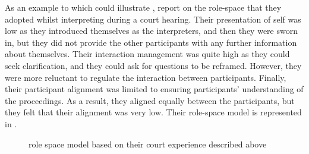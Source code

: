 \documentclass[output=paper]{langsci/langscibook}
\begin{document}
\begin{table}
\caption{\label{tab:devaux:1}Sample list of role-space criteria}
\end{table}
As an example to which could illustrate , \citet[77--78]{Llewellyn-Jones2014} report on the role-space that they adopted whilst interpreting during a court hearing. Their presentation of self was low as they introduced themselves as the interpreters, and then they were sworn in, but they did not provide the other participants with any further information about themselves. Their interaction management was quite high as they could seek clarification, and they could ask for questions to be reframed. However, they were more reluctant to regulate the interaction between participants. Finally, their participant alignment was limited to ensuring participants’ understanding of the proceedings. As a result, they aligned equally between the participants, but they felt that their alignment was very low. Their role-space model is represented in . 

  
 

\begin{figure}
\caption{ role space model based on their court experience described above\label{fig:devaux:2}}
\end{figure}
\end{document}
